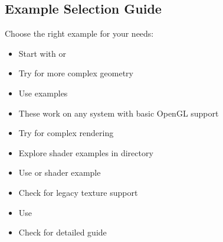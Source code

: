 \documentclass[a4paper,10pt,english,openany,oneside]{sphinxmanual}
\begin{document}
\subsection{Example Selection Guide}
\label{\detokenize{examples:example-selection-guide}}
\sphinxAtStartPar
Choose the right example for your needs:
\begin{description}
\begin{itemize}
\item {} 
\sphinxAtStartPar
Start with  or 

\item {} 
\sphinxAtStartPar
Try  for more complex geometry

\end{itemize}

\begin{itemize}
\item {} 
\sphinxAtStartPar
Use  examples

\item {} 
\sphinxAtStartPar
These work on any system with basic OpenGL support

\end{itemize}

\begin{itemize}
\item {} 
\sphinxAtStartPar
Try  for complex rendering

\item {} 
\sphinxAtStartPar
Explore shader examples in  directory

\end{itemize}

\begin{itemize}
\item {} 
\sphinxAtStartPar
Use  or  shader example

\item {} 
\sphinxAtStartPar
Check  for legacy texture support

\end{itemize}

\begin{itemize}
\item {} 
\sphinxAtStartPar
Use 

\item {} 
\sphinxAtStartPar
Check  for detailed guide

\end{itemize}

\end{description}
\end{document}
